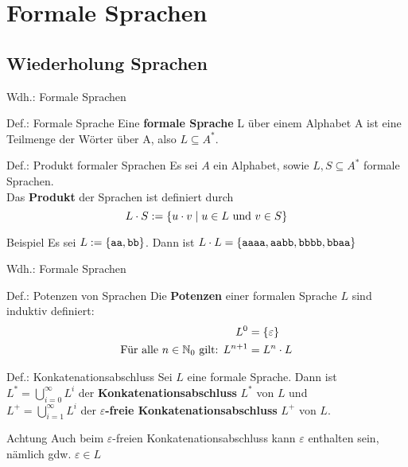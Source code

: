 \section{Formale Sprachen}
\subsection{Wiederholung Sprachen} %
\begin{frame}{Wdh.: Formale Sprachen}
	\begin{block}{Def.: Formale Sprache}
		Eine \textbf{formale Sprache} L über einem Alphabet A ist eine Teilmenge der Wörter über A, also \(L \subseteq A^{*}\).
	\end{block}

	\begin{block}{Def.: Produkt formaler Sprachen}
		Es sei $A$ ein Alphabet, sowie $L,S \subseteq A^*$ formale Sprachen.\\
		Das \textbf{Produkt} der Sprachen ist definiert durch
		\[
			L \cdot S := \left\{ u \cdot v \mid u \in L \text{ und } v \in S \right\}
		\]
	\end{block}

	\begin{exampleblock}{Beispiel}
		Es sei $L:=\left\{ \texttt{aa}, \texttt{bb} \right\}$. Dann ist $L\cdot L = \left\{ \texttt{aaaa}, \texttt{aabb}, \texttt{bbbb}, \texttt{bbaa} \right\}$
	\end{exampleblock}
\end{frame}

\begin{frame}{Wdh.: Formale Sprachen}
	\begin{block}{Def.: Potenzen von Sprachen}
		Die \textbf{Potenzen} einer formalen Sprache $L$ sind induktiv definiert:
		\begin{align*}
			L^0 &= \left\{ \varepsilon \right\} \\
			\text{Für alle $n \in \mathbb{N}_0$ gilt: } L^{n+1} &= L^n \cdot L
		\end{align*}
	\end{block}

	\begin{block}{Def.: Konkatenationsabschluss}
		Sei $L$ eine formale Sprache. Dann ist \\
		$L^* = \bigcup_{i=0}^{\infty} L^{i}$ der \textbf{Konkatenationsabschluss} $L^*$ von $L$ und \\
		$L^+ = \bigcup_{i=1}^{\infty} L^{i}$ der \textbf{$\varepsilon$-freie Konkatenationsabschluss} $L^+$ von $L$.
	\end{block}

	\begin{alertblock}{Achtung}
		Auch beim $\varepsilon$-freien Konkatenationsabschluss kann $\varepsilon$ enthalten sein, nämlich gdw. $\varepsilon \in L$
	\end{alertblock}
\end{frame}



